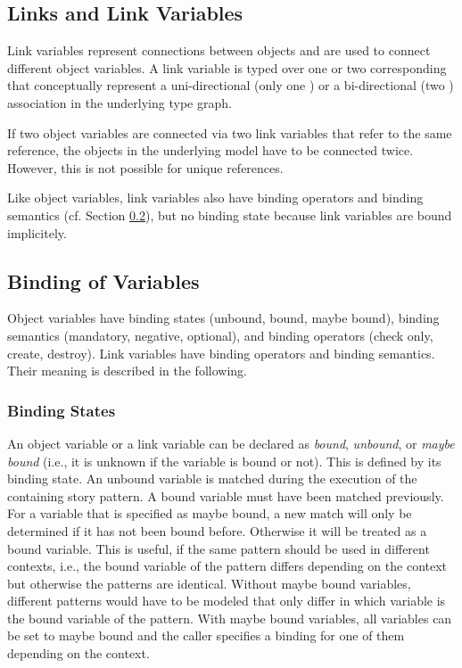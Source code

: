 \subsection{Links and Link Variables}
\label{sec:StoryPatterns:links}

Link variables represent connections between objects and are used to connect
different object variables.
A link variable is typed over one or two corresponding  that
conceptually represent a uni-directional (only one ) or a
bi-directional (two ) association in the underlying type graph.

If two object variables are connected via two link variables that refer to the
same reference, the objects in the underlying model have to be connected twice.
However, this is not possible for unique references. 

Like object variables, link variables also have binding
operators and binding semantics (cf. Section \ref{sec:StoryPatterns:binding}),
but no binding state because link variables are bound implicitely.




\subsection{Binding of Variables}
\label{sec:StoryPatterns:binding}

Object variables have binding states (unbound, bound, maybe
bound), binding semantics (mandatory, negative, optional), and binding operators
(check only, create, destroy). Link variables have binding
operators and binding semantics.
Their meaning is described in the following. 


\subsubsection{Binding States}
\label{sec:StoryPatterns:binding:states}

An object variable or a link variable can be declared as \emph{bound}, \emph{unbound}, or
\emph{maybe bound} (i.e., it is unknown if the variable is bound or not). This is
defined by its binding state. An unbound variable is matched during the
execution of the containing story pattern. 
A bound variable must have been matched previously. 
For a variable that is specified as maybe bound, a new match will only be
determined if it has not been bound before. 
Otherwise it will be treated as a bound variable.
This is useful, if the same pattern should be used in different contexts, i.e., the bound variable of the pattern differs depending on the context but otherwise the patterns are identical.
Without maybe bound variables, different patterns would have to be modeled that only differ in which variable is the bound variable of the pattern.
With maybe bound variables, all variables can be set to maybe bound and the caller specifies a binding for one of them depending on the context.

